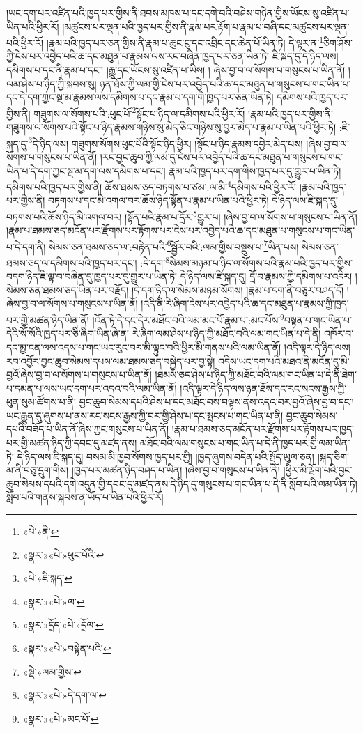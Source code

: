 །ཡང་དག་པར་འཛིན་པའི་ཁྱད་པར་གྱིས་ནི་ཐབས་མཁས་པ་དང་དགེ་བའི་བཤེས་གཉེན་གྱིས་ཡོངས་སུ་འཛིན་པ་ཡིན་པའི་ཕྱིར་རོ། །མཚུངས་པར་ལྡན་པའི་ཁྱད་པར་གྱིས་ནི་རྣམ་པར་རྟོག་པ་རྣམ་པ་བཞི་དང་མཚུངས་པར་ལྡན་པའི་ཕྱིར་རོ། །རྣམ་པའི་ཁྱད་པར་ཅན་གྱིས་ནི་རྣམ་པ་ཆུང་ངུ་དང་འབྲིང་དང་ཆེན་པོ་ཡིན་ཏེ། དེ་ལྟར་ན་\footnote{«པེ་»ནི་}ཅིག་ཤོས་ཀྱི་ངེས་པར་འབྱེད་པའི་ཆ་དང་མཐུན་པ་རྣམས་ལས་རང་བཞིན་ཁྱད་པར་ཅན་ཡིན་ཏེ། ཇི་སྐད་དུ་དེ་ཉིད་ལས། དམིགས་པ་དང་ནི་རྣམ་པ་དང་། །རྒྱུ་དང་ཡོངས་སུ་འཛིན་པ་ཡིས། །
ཞེས་བྱ་བ་ལ་སོགས་པ་གསུངས་པ་ཡིན་ནོ། །ལམ་ཤེས་པ་ཉིད་ཀྱི་སྐབས་སུ། ཉན་ཐོས་ཀྱི་ལམ་གྱི་ངེས་པར་འབྱེད་པའི་ཆ་དང་མཐུན་པ་གསུངས་པ་གང་ཡིན་པ་དང་དེ་དག་ཀྱང་སྔ་མ་རྣམས་ལས་དམིགས་པ་དང་རྣམ་པ་དག་གི་ཁྱད་པར་ཅན་ཡིན་ཏེ། དམིགས་པའི་ཁྱད་པར་གྱིས་ནི། གཟུགས་ལ་སོགས་པའི་:ཕུང་པོ་\footnote{«སྣར་»«པེ་»ཕུང་པོའི་}སྟོང་པ་ཉིད་ལ་དམིགས་པའི་ཕྱིར་རོ། །རྣམ་པའི་ཁྱད་པར་གྱིས་ནི་གཟུགས་ལ་སོགས་པའི་སྟོང་པ་ཉིད་རྣམས་གཉིས་སུ་མེད་ཅིང་གཉིས་སུ་བྱར་མེད་པ་རྣམ་པ་ཡིན་པའི་ཕྱིར་ཏེ། :ཇི་སྐད་དུ་\footnote{«པེ་»ཇི་སྐད་}དེ་ཉིད་ལས། གཟུགས་སོགས་ཕུང་པོའི་སྟོང་ཉིད་ཕྱིར། །སྟོང་པ་ཉིད་རྣམས་དབྱེར་མེད་པས། །ཞེས་བྱ་བ་ལ་སོགས་པ་གསུངས་པ་ཡིན་ནོ། །རང་བྱང་ཆུབ་ཀྱི་ལམ་དུ་ངེས་པར་འབྱེད་པའི་ཆ་དང་མཐུན་པ་གསུངས་པ་གང་ཡིན་པ་དེ་དག་ཀྱང་སྔ་མ་དག་ལས་དམིགས་པ་དང་། རྣམ་པའི་ཁྱད་པར་དག་གིས་ཁྱད་པར་དུ་གྱུར་པ་ཡིན་ཏེ། དམིགས་པའི་ཁྱད་པར་གྱིས་ནི། ཆོས་ཐམས་ཅད་བཏགས་པ་ཙམ་:ལ་མི་\footnote{«སྣར་»«པེ་»ལ་}དམིགས་པའི་ཕྱིར་རོ། །རྣམ་པའི་ཁྱད་པར་གྱིས་ནི། བཏགས་པ་དང་མི་འགལ་བར་ཆོས་ཉིད་སྟོན་པ་རྣམ་པ་ཡིན་པའི་ཕྱིར་ཏེ། དེ་ཉིད་ལས་ཇི་སྐད་དུ། བཏགས་པའི་ཆོས་ཉིད་མི་འགལ་བར། །སྟོན་པའི་རྣམ་པ་དྲོར་\footnote{«སྣར་»དྲོད་«པེ་»དྲོལ་}གྱུར་པ། །ཞེས་བྱ་བ་ལ་སོགས་པ་གསུངས་པ་ཡིན་ནོ། །རྣམ་པ་ཐམས་ཅད་མངོན་པར་རྫོགས་པར་རྟོགས་པར་ངེས་པར་འབྱེད་པའི་ཆ་དང་མཐུན་པ་གསུངས་པ་གང་ཡིན་པ་དེ་དག་ནི། སེམས་ཅན་ཐམས་ཅད་ལ་:བརྟེན་པའི་\footnote{«སྣར་»«པེ་»བསྟེན་པའི་}སྦྱོར་བའི་:ལམ་གྱིས་བསྡུས་པ་\footnote{«སྡེ་»ལམ་གྱིས་}ཡིན་པས། སེམས་ཅན་ཐམས་ཅད་ལ་དམིགས་པའི་ཁྱད་པར་དང་། :དེ་དག་\footnote{«སྣར་»«པེ་»དེ་དག་ལ་}སེམས་མཉམ་པ་ཉིད་ལ་སོགས་པའི་རྣམ་པའི་ཁྱད་པར་གྱིས་བདག་ཉིད་ཇི་ལྟ་བ་བཞིན་དུ་ཁྱད་པར་དུ་གྱུར་པ་ཡིན་ཏེ། དེ་ཉིད་ལས་ཇི་སྐད་དུ། དྲོ་བ་རྣམས་ཀྱི་དམིགས་པ་འདིར། །སེམས་ཅན་ཐམས་ཅད་ཡིན་པར་བརྗོད། །དེ་དག་ཉིད་ལ་སེམས་མཉམ་སོགས། །རྣམ་པ་དག་ནི་བཅུར་བཤད་དོ། །ཞེས་བྱ་བ་ལ་སོགས་པ་གསུངས་པ་ཡིན་ནོ། །འདི་ནི་རེ་ཞིག་ངེས་པར་འབྱེད་པའི་ཆ་དང་མཐུན་པ་རྣམས་ཀྱི་ཁྱད་པར་གྱི་མཚན་ཉིད་ཡིན་ནོ། །འོན་ཏེ་དེ་དང་དེར་མཐོང་བའི་ལམ་མང་པོ་རྣམ་པ་:མང་པོས་\footnote{«སྣར་»«པེ་»མང་པོ་}བསྟན་པ་གང་ཡིན་པ་དེའི་སོ་སོའི་ཁྱད་པར་ཅི་ཞིག་ཡིན་ཞེ་ན། རེ་ཞིག་ལམ་ཤེས་པ་ཉིད་ཀྱི་མཐོང་བའི་ལམ་གང་ཡིན་པ་དེ་ནི། འཁོར་བ་དང་མྱ་ངན་ལས་འདས་པ་གང་ཡང་རུང་བར་མི་ལྟུང་བའི་ཕྱིར་མི་གནས་པའི་ལམ་ཡིན་ནོ། །འདི་ལྟར་དེ་ཉིད་ལས། རབ་འབྱོར་བྱང་ཆུབ་སེམས་དཔས་ལམ་ཐམས་ཅད་བསྐྱེད་པར་བྱ་སྟེ། འདིས་ཡང་དག་པའི་མཐའ་ནི་མངོན་དུ་མི་བྱའོ་ཞེས་བྱ་བ་ལ་སོགས་པ་གསུངས་པ་ཡིན་ནོ། །ཐམས་ཅད་ཤེས་པ་ཉིད་ཀྱི་མཐོང་བའི་ལམ་གང་ཡིན་པ་དེ་ནི་ཐེག་པ་དམན་པ་ལས་ཡང་དག་པར་འདའ་བའི་ལམ་ཡིན་ནོ། །འདི་ལྟར་དེ་ཉིད་ལས་ཉན་ཐོས་དང་རང་སངས་རྒྱས་ཀྱི་ཕུན་སུམ་ཚོགས་པ་ནི། བྱང་ཆུབ་སེམས་དཔའི་ཤེས་པ་དང་མཐོང་བས་བལྟས་ནས་འདའ་བར་བྱའོ་ཞེས་བྱ་བ་དང་། ཡང་རྒྱུན་དུ་ཞུགས་པ་ནས་རང་སངས་རྒྱས་ཀྱི་བར་གྱི་ཤེས་པ་དང་སྤངས་པ་གང་ཡིན་པ་ནི། བྱང་ཆུབ་སེམས་དཔའི་བཟོད་པ་ཡིན་ནོ་ཞེས་ཀྱང་གསུངས་པ་ཡིན་ནོ། །རྣམ་པ་ཐམས་ཅད་མངོན་པར་རྫོགས་པར་རྟོགས་པར་ཁྱད་པར་གྱི་མཚན་ཉིད་ཀྱི་དབང་དུ་མཛད་ནས། མཐོང་བའི་ལམ་གསུངས་པ་གང་ཡིན་པ་དེ་ནི་ཁྱད་པར་གྱི་ལམ་ཡིན་ཏེ། དེ་ཉིད་ལས་ཇི་སྐད་དུ། བསམ་མི་ཁྱབ་སོགས་ཁྱད་པར་གྱི། །ཁྱད་ཞུགས་བདེན་པའི་སྤྱོད་ཡུལ་ཅན། །སྐད་ཅིག་མ་ནི་བཅུ་དྲུག་གིས། །ཁྱད་པར་མཚན་ཉིད་བཤད་པ་ཡིན། །ཞེས་བྱ་བ་གསུངས་པ་ཡིན་ནོ། །ཕྱིར་མི་ལྡོག་པའི་བྱང་ཆུབ་སེམས་དཔའི་དགེ་འདུན་གྱི་དབང་དུ་མཛད་ནས་དེ་ཉིད་དུ་གསུངས་པ་གང་ཡིན་པ་དེ་ནི་སློབ་པའི་ལམ་ཡིན་ཏེ། སློབ་པའི་གནས་སྐབས་ན་ཡོད་པ་ཡིན་པའི་ཕྱིར་རོ། 